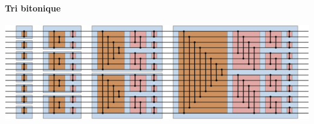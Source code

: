 \begin{frame}
    
\end{frame}


\begin{frame}
    \frametitle{\trdpti}
    \framesubtitle{Tri bitonique}
    
    \centering
    \includegraphics[width=1.0\linewidth]{figures/bitonic_sort.png}
    
\end{frame}
